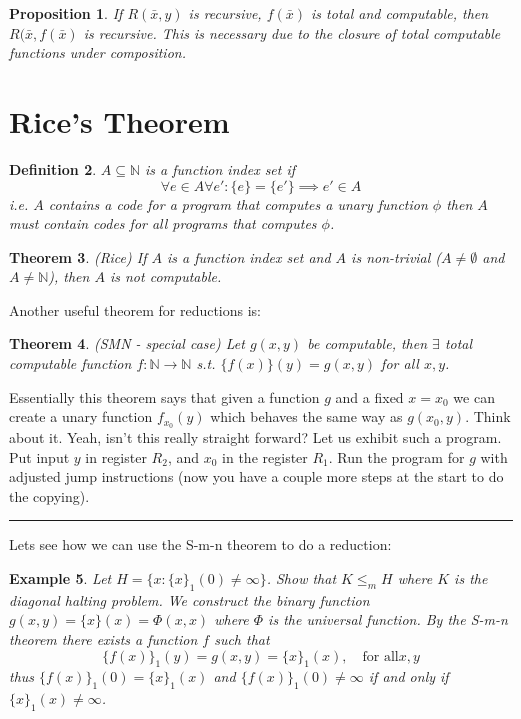 \documentclass[twoside]{article}
\newcounter{lecnum}
\newtheorem{theorem}{Theorem}[lecnum]
\newtheorem{proposition}[theorem]{Proposition}
\newtheorem{definition}[theorem]{Definition}
\newtheorem{example}[theorem]{Example}
\newenvironment{proof}{{\bf Proof:}}{\hfill\rule{2mm}{2mm}}
\def\N{\mathbb{N}}
\begin{document}
\begin{proposition}
If $R(\bar{x},y)$ is recursive, $f(\bar{x})$ is total and computable, then $R(\bar{x}, f(\bar{x})$ is recursive. This is necessary due to the closure of total computable functions under composition. 
\end{proposition}

\section{Rice's Theorem}
\begin{definition}
$A \subseteq \N$ is a \emph{function index set} if 
\[\forall e \in A \forall e': \{e\} = \{e'\} \implies e' \in A\]
i.e. $A$ contains a code for a program that computes a unary function $\phi$ then $A$ must contain codes for all programs that computes $\phi$. 
\end{definition}

\begin{theorem}
(Rice) If $A$ is a function index set and $A$ is non-trivial ($A \neq \emptyset$ and $A \neq \N$), then $A$ is not computable. 
\end{theorem}

Another useful theorem for reductions is:
\begin{theorem}
(SMN - special case) Let $g(x,y)$ be computable, then $\exists$ total computable function $f: \N \rightarrow \N$ s.t. $\{f(x)\}(y) = g(x,y)$ for all $x, y$.  
\end{theorem}
\begin{proof}
Essentially this theorem says that given a function $g$ and a fixed $x = x_0$ we can create a unary function $f_{x_0}(y)$ which behaves the same way as $g(x_0, y)$. Think about it. Yeah, isn't this really straight forward? Let us exhibit such a program. Put input $y$ in register $R_2$, and $x_0$ in the register $R_1$. Run the program for $g$ with adjusted jump instructions (now you have a couple more steps at the start to do the copying).   
\end{proof}

Lets see how we can use the S-m-n theorem to do a reduction:
\begin{example}
Let $H = \{x: \{x\}_1(0) \neq \infty \}$. Show that $K \leq_m H$ where $K$ is the diagonal halting problem. We construct the binary function $g(x,y) = \{x\}(x) = \Phi(x,x)$ where $\Phi$ is the universal function. By the S-m-n theorem there exists a function $f$ such that 
\[\{f(x)\}_1(y) = g(x, y) = \{x\}_1(x), \quad \mbox{for all} x,y\]
thus $\{f(x)\}_1(0) = \{x\}_1(x)$ and $\{f(x)\}_1(0) \neq \infty$ if and only if $\{x\}_1(x) \neq \infty$.
\end{example}
\end{document}
